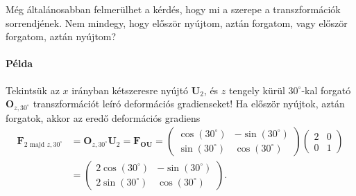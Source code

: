 \documentclass[12pt,a4paper]{scrartcl}
\let\mathbf\bm
\begin{document}
Még általánosabban felmerülhet a kérdés, hogy mi a szerepe a transzformációk sorrendjének. Nem mindegy, hogy először nyújtom, aztán forgatom, vagy először forgatom, aztán nyújtom?

\paragraph{Példa}
Tekintsük az $x$ irányban kétszeresre nyújtó ${{\mathbf{U}}_2}$, és $z$ tengely kürül $30^\circ$-kal forgató ${{\mathbf{O}}_{z,30^\circ }}$ transzformációt leíró deformációs gradienseket! Ha először nyújtok, aztán forgatok, akkor az eredő deformációs gradiens
\[\begin{aligned}
  {{\mathbf{F}}_{2{\text{ majd }}z,30^\circ }} &  = {{\mathbf{O}}_{z,30^\circ }}{{\mathbf{U}}_2} =  {{\mathbf{F}}_{{\mathbf{OU}}}} = \left( {\begin{array}{*{20}{c}}
  {\cos \left( {30^\circ } \right)}&{ - \sin \left( {30^\circ } \right)} \\ 
  {\sin \left( {30^\circ } \right)}&{\cos \left( {30^\circ } \right)} 
\end{array}} \right)\left( {\begin{array}{*{20}{c}}
  2&0 \\ 
  0&1 
\end{array}} \right) \\ 
   &  = \left( {\begin{array}{*{20}{c}}
  {2\cos \left( {30^\circ } \right)}&{ - \sin \left( {30^\circ } \right)} \\ 
  {2\sin \left( {30^\circ } \right)}&{\cos \left( {30^\circ } \right)} 
\end{array}} \right). \\ 
\end{aligned} \]
\end{document}
